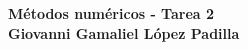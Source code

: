 \begin{center}
	\textbf{
		\textcolor{title}{Métodos numéricos - Tarea 2\\ Giovanni Gamaliel López Padilla}}
\end{center}
